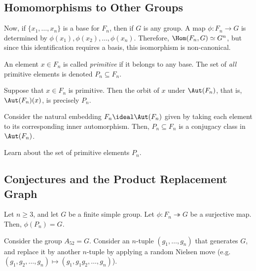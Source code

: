 \documentclass[12pt]{article}
\begin{document}
\subsection{Homomorphisms to Other Groups}

Now, if $\{x_1,\ldots,x_n\}$ is a base for $F_n$, then if $G$ is any group. A map $\phi: F_n \rightarrow G$ is determined by $\phi(x_1),\phi(x_2),\ldots,\phi(x_n)$. Therefore, $\Hom(F_n,G) \simeq G^n$, but since this identification requires a basis, this isomorphism is non-canonical.

\begin{definition}\label{def:Primitive_Elements}
    An element $x \in F_n$ is called \emph{primitive} if it belongs to any base. The set of \emph{all} primitive elements is denoted $P_n \subseteq F_n$.
\end{definition}

\begin{example}\label{exam:Primitive_Elements_and_Automorphisms}
    Suppose that $x \in F_n$ is primitive. Then the orbit of $x$ under $\Aut(F_n)$, that is, $\Aut(F_n)(x)$, is precisely $P_n$.
\end{example}

\begin{example}\label{exam:Self_Embeddings}
    Consider the natural embedding $F_n \ideal \Aut(F_n)$ given by taking each element to its corresponding inner automorphism. Then, $P_n \subseteq F_n$ is a conjugacy class in $\Aut(F_n)$.
\end{example}

\begin{problem}\label{prob:Learn_About_Primitive_Elements}
    Learn about the set of primitive elements $P_n$.
\end{problem}

\subsection{Conjectures and the Product Replacement Graph}

\begin{conjecture}\label{conj:An_Open_Problem}
    Let $n \geq 3$, and let $G$ be a finite simple group. Let $\phi: F_n \twoheadrightarrow G$ be a surjective map. Then, $\phi(P_n) = G$.
\end{conjecture}

Consider the group $A_{52} = G$. Consider an $n$-tuple $(g_1,\ldots,g_n)$ that generates $G$, and replace it by another $n$-tuple by applying a random Nielsen move (e.g. $(g_1,g_2,\ldots,g_n) \mapsto (g_1,g_1g_2,\ldots,g_n)$).
\end{document}
